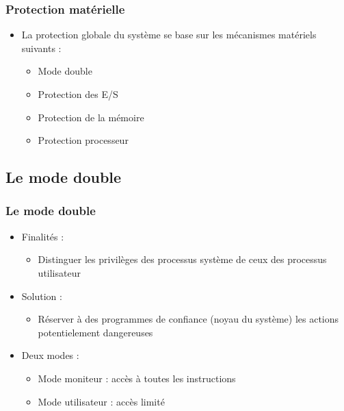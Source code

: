 \begin{frame}
\frametitle{Protection matérielle}
\begin{itemize}
\item La protection globale du système se base sur les mécanismes matériels suivants :
\begin{itemize}
\item Mode double
\item Protection des E/S
\item Protection de la mémoire
\item Protection processeur
\end{itemize}
\end{itemize}
\end{frame}


\subsection{Le mode double}

\begin{frame}
 \frametitle{Le mode double}
 \begin{itemize}
 \item Finalités :
\begin{itemize}
\item Distinguer les privilèges des processus système de ceux des processus utilisateur
\end{itemize}
\item Solution :
\begin{itemize}
\item Réserver à des programmes de confiance (noyau du système) les actions potentielement dangereuses
\end{itemize}
\item Deux modes :
\begin{itemize}
\item Mode moniteur : accès à toutes les instructions
\item Mode utilisateur : accès limité
\end{itemize}
\end{itemize}
\end{frame}


